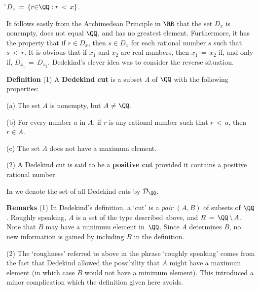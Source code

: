 {{\VA

        \h $D_{x} \,=\, \{r{\in}{\QQ}: r\,<\,x\}$.

\VA

\noindent It follows easily from the Archimedean Principle in ${\RR}$ that the set $D_{x}$ is nonempty, does not equal ${\QQ}$, and has no greatest element.
    Furthermore, it has the property that if $r{\in}D_{x}$, then $s{\in}D_{x}$ for each rational number $s$ such that $s\,<\,r$.
    It is obvious that if $x_{1}$ and $x_{2}$ are real numbers, then $x_{1} \,=\, x_{2}$ if, and only if, $D_{x_{1}} \,=\, D_{x_{2}}$.
    Dedekind's clever idea was to consider the reverse situation.

\V

        {\bf Definition} (1) A {\bf Dedekind cut} is a subset $A$ of ${\QQ}$ with the following properties:

        (a) The set $A$ is nonempty, but $A \,\,{\neq}\,\, {\QQ}$.

\V

        (b) For every number $a$ in $A$, if $r$ is any rational number such that $r\,<\,a$, then $r{\in}A$.

\V

        (c) The set $A$ does not have a maximum element.

\V

        (2) A Dedekind cut is said to be a {\bf positive cut} provided it contains a positive rational number.

\V

 \noindent In {\ThisText} we denote the set of all Dedekind cuts by ${\cal D}_{{\QQ}}$.

\VV

        {\bf Remarks} (1) In Dedekind's definition, a `cut' is a {\em pair} $(A,B)$ of subsets of ${\QQ}$.
    Roughly speaking, $A$ is a set of the type described above, and $B \,=\, {\QQ}\,{\setminus}\,A$. Note that $B$ may have a minimum element in~${\QQ}$.
    Since $A$ determines $B$, no new information is gained by including $B$ in the definition.

\V

        (2) The `roughness' referred to above in the phrase `roughly speaking' comes from the fact that
    Dedekind allowed the possibility that $A$ might have a maximum element (in which case $B$ would not have a minimum element).
    This introduced a minor complication which the definition given here avoids.

\VV

}}
